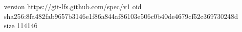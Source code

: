 version https://git-lfs.github.com/spec/v1
oid sha256:8fa482fab9657b3146e1f86a844af86103e506c0b40de4679cf52c369730248d
size 114146
